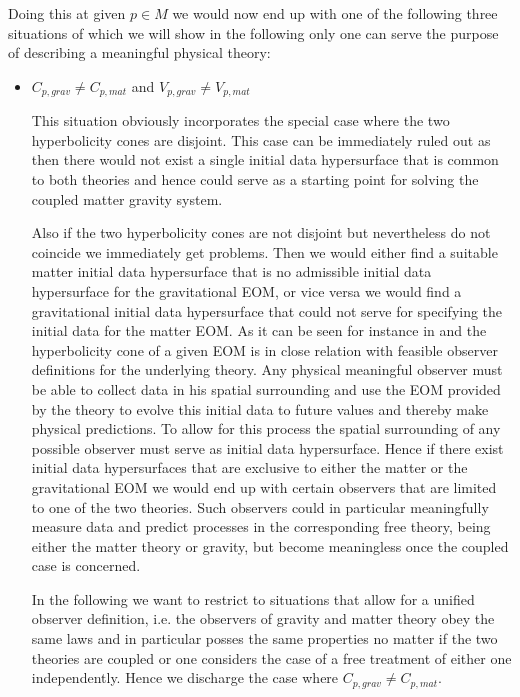 \documentclass[a4paper,12pt, DIV=14, BCOR=5mm, twoside, headsepline]{scrbook}
\begin{document}
Doing this at given $p \in M$ we would now end up with one of the following three situations of which we will show in the following only one can serve the purpose of describing a meaningful physical theory:
\begin{itemize}
    \item $C_{p,grav} \neq C_{p,mat}$ and $V_{p,grav} \neq V_{p,mat}$
    
This situation obviously incorporates the special case where the two hyperbolicity cones are disjoint. This case can be immediately ruled out as then there would not exist a single initial data hypersurface that is common to both theories and hence could serve as a starting point for solving the coupled matter gravity system.   

Also if the two hyperbolicity cones are not disjoint but nevertheless do not coincide we immediately get problems. Then we would either find a suitable matter initial data hypersurface that is no admissible initial data hypersurface for the gravitational EOM, or vice versa we would find a gravitational initial data hypersurface that could not serve for specifying the initial data for the matter EOM. As it can be seen for instance in \cite{Rivera} and \cite{2011PhRvD..83d4047R} the hyperbolicity cone of a given EOM is in close relation with feasible observer definitions for the underlying theory. Any physical meaningful observer must be able to collect data in his spatial surrounding and use the EOM provided by the theory to evolve this initial data to future values and thereby make physical predictions. To allow for this process the spatial surrounding of any possible observer must serve as initial data hypersurface. Hence if there exist initial data hypersurfaces that are exclusive to either the matter or the gravitational EOM we would end up with certain observers that are limited to one of the two theories. Such observers could in particular meaningfully measure data and predict processes in the corresponding free theory, being either the matter theory or gravity, but become meaningless once the coupled case is concerned.

In the following we want to restrict to situations that allow for a unified observer definition, i.e. the observers of gravity and matter theory obey the same laws and in particular posses the same properties no matter if the two theories are coupled or one considers the case of a free treatment of either one independently. Hence we discharge the case where $C_{p,grav} \neq C_{p,mat}$.


\end{itemize}
\end{document}
